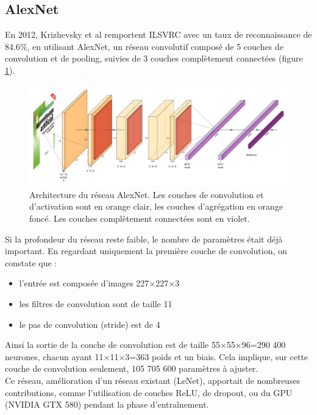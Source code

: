 \documentclass{DocBleu}
\begin{document}
\subsection{AlexNet}
En 2012,  Krizhevsky et al \cite{Krizhevsky12} remportent ILSVRC avec un taux de reconnaissance de 84.6\%, en utilisant AlexNet, un réseau convolutif composé de 5 couches de convolution et de pooling, suivies de 3 couches complètement connectées (figure \ref{F:Alexnet}). 
\begin{figure}[hbtp!]
\centering
\includegraphics[width=\textwidth]{images/AlexNet.pdf}
\caption{Architecture du r\'eseau AlexNet. Les couches de convolution et d'activation sont en orange clair, les couches d'agr\'egation en orange fonc\'e. Les couches compl\`etement connect\'ees sont en violet.}
\label{F:Alexnet}
\end{figure}



Si la profondeur du réseau reste faible, le nombre de paramètres était déjà important. En regardant uniquement la première couche de convolution, on constate que :
\begin{itemize}
\item l'entrée est composée d'images 227$\times$227$\times$3
\item les filtres  de convolution sont de taille 11
\item le pas de convolution (stride) est de 4
\end{itemize}
Ainsi la sortie de la couche de convolution est de taille 55$\times$55$\times$96=290 400 neurones, chacun ayant 11$\times$11$\times$3=363 poids et un biais.  Cela implique, sur cette couche de convolution seulement, 105 705 600 paramètres à ajuster.\\
Ce réseau, amélioration d'un réseau existant (LeNet), apportait de nombreuses contributions, comme l'utilisation de couches ReLU, de dropout, ou du GPU (NVIDIA GTX 580) pendant la phase d'entraînement.
\end{document}
